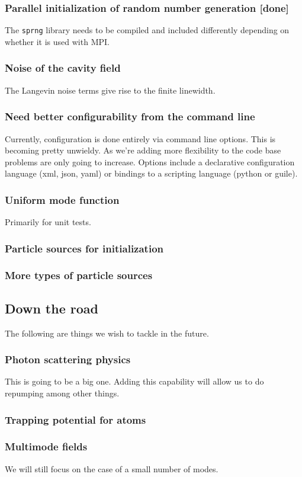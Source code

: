 \documentclass[aps, superscriptaddress, groupedaddress, preprint]{revtex4}
\begin{document}
\subsubsection{Parallel initialization of random number
generation {\bf [done]}}

The \verb~sprng~ library needs to be compiled and included
differently depending on whether it is used with MPI.


\subsubsection{Noise of the cavity field}

The Langevin noise terms give rise to the finite linewidth.


\subsubsection{Need better configurability from the command line}

Currently, configuration is done entirely via command line
options.  This is becoming pretty unwieldy.  As we're adding more
flexibility to  the code base problems are only going to
increase.  Options include a declarative configuration language
(xml, json, yaml) or bindings to a scripting language (python or
guile).


\subsubsection{Uniform mode function}

 Primarily for unit tests.


\subsubsection{Particle sources for initialization}


\subsubsection{More types of particle sources}


\subsection{Down the road}

The following are things we wish to tackle in the future.


\subsubsection{Photon scattering physics} This is going to be a big
one.  Adding this capability will allow us to do repumping among
other things.


\subsubsection{Trapping potential for atoms}


\subsubsection{Multimode fields} We will still focus on the case
of a small number of modes.
\end{document}
